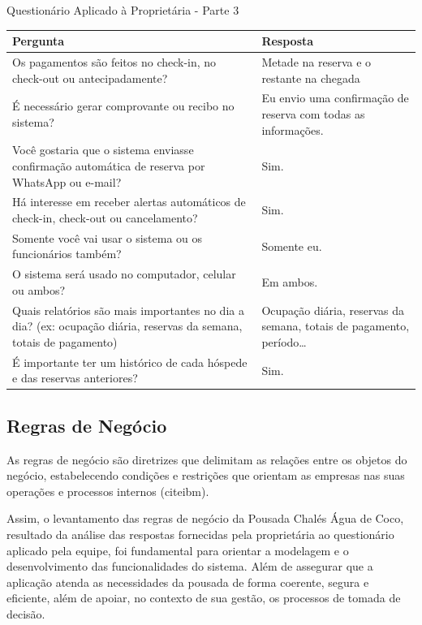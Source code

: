 \documentclass[
	12pt,				%
	openany,			%
	twoside,			%
	a4paper,			%
	english,			%
	french,				%
	spanish,			%
	brazil				%
	]{abntex2}
\begin{document}
%		
\begin{quadro}[H]
	\caption{Questionário Aplicado à Proprietária - Parte 3}
	\label{questionario_3}
	\begin{tabular}{|p{7.5cm}|p{7.5cm}|}
		\hline
		\textbf{Pergunta} & \textbf{Resposta}  \\ \hline
		Os pagamentos são feitos no check-in, no check-out ou antecipadamente? &
		Metade na reserva e o restante na chegada
		\\ \hline
		É necessário gerar comprovante ou recibo no sistema? &
		Eu envio uma confirmação de reserva com todas as informações.
		\\ \hline
		Você gostaria que o sistema enviasse confirmação automática de reserva por WhatsApp ou e-mail? &
		Sim.
		\\ \hline		
		Há interesse em receber alertas automáticos de check-in, check-out ou cancelamento? &
		Sim.
		\\ \hline
		Somente você vai usar o sistema ou os funcionários também? &
		Somente eu.
		\\ \hline
		O sistema será usado no computador, celular ou ambos? &
		Em ambos.
		\\ \hline
		Quais relatórios são mais importantes no dia a dia? (ex: ocupação diária, reservas da semana, totais de pagamento) &
		Ocupação diária, reservas da semana, totais de pagamento, período…
		\\ \hline
		É importante ter um histórico de cada hóspede e das reservas anteriores?
		& Sim.
		\\ \hline
\end{tabular}
	\end{quadro}

\subsection{Regras de Negócio}
As regras de negócio são diretrizes que delimitam as relações entre os objetos do negócio, estabelecendo condições e restrições que orientam as empresas nas suas operações e processos internos (cite{ibm}).

Assim, o levantamento das regras de negócio da Pousada Chalés Água de Coco, resultado da análise das respostas fornecidas pela proprietária ao questionário aplicado pela equipe, foi fundamental para orientar a modelagem e o desenvolvimento das funcionalidades do sistema. Além de assegurar que a aplicação atenda as necessidades da pousada de forma coerente, segura  e eficiente, além de apoiar, no contexto de sua gestão, os processos de tomada de decisão. 
\end{document}
